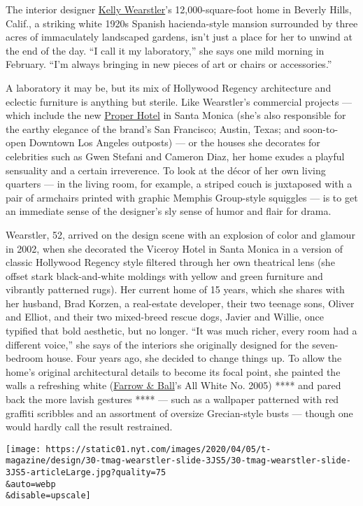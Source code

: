 The interior designer \href{https://www.kellywearstler.com/}{Kelly
Wearstler}'s 12,000-square-foot home in Beverly Hills, Calif., a
striking white 1920s Spanish hacienda-style mansion surrounded by three
acres of immaculately landscaped gardens, isn't just a place for her to
unwind at the end of the day. ``I call it my laboratory,'' she says one
mild morning in February. ``I'm always bringing in new pieces of art or
chairs or accessories.''

A laboratory it may be, but its mix of Hollywood Regency architecture
and eclectic furniture is anything but sterile. Like Wearstler's
commercial projects --- which include the new
\href{https://www.properhotel.com/}{Proper Hotel} in Santa Monica (she's
also responsible for the earthy elegance of the brand's San Francisco;
Austin, Texas; and soon-to-open Downtown Los Angeles outposts) --- or
the houses she decorates for celebrities such as Gwen Stefani and
Cameron Diaz, her home exudes a playful sensuality and a certain
irreverence. To look at the décor of her own living quarters --- in the
living room, for example, a striped couch is juxtaposed with a pair of
armchairs printed with graphic Memphis Group-style squiggles --- is to
get an immediate sense of the designer's sly sense of humor and flair
for drama.

Wearstler, 52, arrived on the design scene with an explosion of color
and glamour in 2002, when she decorated the Viceroy Hotel in Santa
Monica in a version of classic Hollywood Regency style filtered through
her own theatrical lens (she offset stark black-and-white moldings with
yellow and green furniture and vibrantly patterned rugs). Her current
home of 15 years, which she shares with her husband, Brad Korzen, a
real-estate developer, their two teenage sons, Oliver and Elliot, and
their two mixed-breed rescue dogs, Javier and Willie, once typified that
bold aesthetic, but no longer. ``It was much richer, every room had a
different voice,'' she says of the interiors she originally designed for
the seven-bedroom house. Four years ago, she decided to change things
up. To allow the home's original architectural details to become its
focal point, she painted the walls a refreshing white
(\href{https://www.farrow-ball.com/en-us}{Farrow \& Ball}'s All White
No. 2005) **** and pared back the more lavish gestures **** --- such as
a wallpaper patterned with red graffiti scribbles and an assortment of
oversize Grecian-style busts --- though one would hardly call the result
restrained.

\texttt{[image: https://static01.nyt.com/images/2020/04/05/t-magazine/design/30-tmag-wearstler-slide-3JS5/30-tmag-wearstler-slide-3JS5-articleLarge.jpg?quality=75\\\&auto=webp\\\&disable=upscale]}

